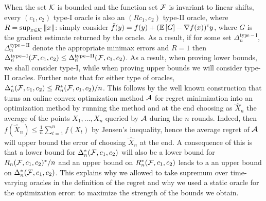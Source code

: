 When the set $\mathcal{K}$ is bounded and the function set $\mathcal{F}$ is invariant to linear shifts, every $(c_1,c_2)$ type-I oracle is also an $(R c_1,c_2)$ type-II oracle,
where $R = \sup_{x\in \mathcal{K}} \|x\|$: simply consider $\tilde{f}(y) =  f(y) + (\mathbb{E}\left[G\right]-\nabla f(x))^\mathsf{\scriptscriptstyle T} y $,
where $G$ is the gradient estimate returned by the oracle. %
As a result, if for some set $\Delta_{n}^{\mathrm{type-I}}$, $\Delta_{n}^{\mathrm{type-II}}$
denote the appropriate minimax errors and $R=1$
then $\Delta_{n}^{\mathrm{type-I}}(\mathcal{F},c_1,c_2) \le \Delta_{n}^{\mathrm{type-II}}(\mathcal{F}, c_1,c_2)  $.
As a result, when proving lower bounds, we shall consider type-I, while when proving upper bounds we will consider type-II oracles.
Further note that for either type of oracles, $\Delta_n^*(\mathcal{F},c_1,c_2) \le R_n^*(\mathcal{F},c_1,c_2)/n$. This follows by the well known construction that turns an online convex optimization method $\mathcal{A}$ for regret minimization into an optimization method by running the method and at the end choosing as $\hat{X}_n$ the average of the points $X_1,\dots,X_n$ queried by $\mathcal{A}$ during the $n$ rounds.
Indeed, then $f(\hat{X}_n) \le \frac1n \sum_{t=1}^n f(X_t)$ by Jensen's inequality, hence the average regret of $\mathcal{A}$ will upper bound the error of choosing $\hat{X}_n$ at the end.
A consequence of this is that a lower bound for $\Delta_n^*(\mathcal{F},c_1,c_2) $ will also be a lower bound for $R_n(\mathcal{F},c_1,c_2)^*/n$ and an upper bound on $R_n^*(\mathcal{F},c_1,c_2)$ leads to a an upper bound on $\Delta_n^*(\mathcal{F},c_1,c_2)$. This explains why we allowed to take supremum over time-varying oracles in the definition of the regret and why we used a static oracle for the optimization error: to maximize the strength of the bounds we obtain.
